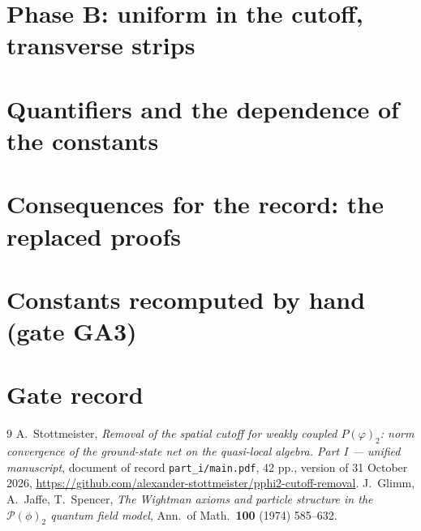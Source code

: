 \section{Phase B: uniform in the cutoff, transverse strips}\label{sec:d4}


\section{Quantifiers and the dependence of the constants}\label{sec:quant}


\section{Consequences for the record: the replaced proofs}\label{sec:cons}


\appendix
\section{Constants recomputed by hand (gate GA3)}\label{app:constants}


\section{Gate record}\label{app:gates}


\begin{thebibliography}{9}
 A.~Stottmeister, \emph{Removal of the spatial cutoff for weakly coupled
$P(\varphi)_2$: norm convergence of the ground-state net on the quasi-local algebra. Part I ---
unified manuscript}, document of record \texttt{part\_i/main.pdf}, 42 pp., version of
31 October 2026, \url{https://github.com/alexander-stottmeister/pphi2-cutoff-removal}.
 J.~Glimm, A.~Jaffe, T.~Spencer,
\emph{The Wightman axioms and particle structure in the $\mathscr P(\phi)_2$ quantum field
model},
Ann.\ of Math.\ \textbf{100} (1974) 585--632.
\end{thebibliography}

